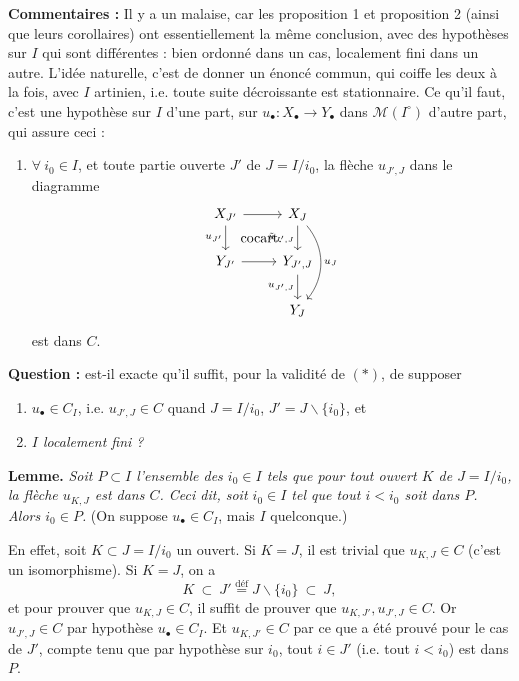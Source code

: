 \documentclass[11pt]{article}
\newcommand{\printedpage}[1]{\marginpar{\footnotesize p.~#1}}
\newcommand{\msp}[1]{\marginpar{\footnotesize [#1]}}
\newcommand{\cocart}{\textup{cocart.}}
\begin{document}
\textbf{Commentaires :} Il y a un malaise, car les proposition 1 et proposition 2 (ainsi que leurs corollaires) ont essentiellement la même conclusion, avec des hypothèses sur $I$ qui sont \msp{page 23} différentes : bien ordonné dans un cas, localement fini dans un autre. L'idée naturelle, c'est de donner un énoncé commun, qui coiffe les deux à la fois, avec $I$ artinien, i.e. toute suite décroissante est stationnaire. Ce qu'il faut, c'est une hypothèse sur $I$ d'une part, sur $u_\bullet : X_\bullet \longrightarrow Y_\bullet$ dans $\mathcal{M}(I^\circ)$ d'autre part, qui assure ceci :

\begin{enumerate}
\item[$(*)$] $\forall\ i_0 \in I$, et toute partie ouverte $J'$ de $J = I/i_0$, la flèche $u_{J',J}$ dans le diagramme
\[
\begin{tikzcd}
X_{J'} \arrow[r] \arrow[d, "u_{J'}"'] \arrow[dr, phantom, "\cocart"] & X_J \arrow[d, "\tilde{u}_{J',J}"'] \arrow[dd, bend left=40, "u_J"] \\
Y_{J'} \arrow[r] & Y_{J',J} \arrow[d, "u_{J',J}"'] \\
 & Y_J
\end{tikzcd}
\]
est dans $C$.
\end{enumerate}

\textbf{Question :} est-il exacte qu'il suffit, pour la validité de $(*)$, de supposer %
\begin{enumerate}
\item[a)] $u_\bullet \in C_I$, i.e. $u_{J',J} \in C$ quand $J = I/i_0$, $J' = J \backslash \{i_0\}$, et
\item[b)] \textit{$I$ localement fini ?}
\end{enumerate}

\printedpage{14}

\msp{page 24}

\textbf{Lemme.} \textit{Soit $P \subset I$ l'ensemble des $i_0 \in I$ tels que pour tout ouvert $K$ de $J = I/i_0$, la flèche $u_{K,J}$ est dans $C$. Ceci dit, soit $i_0 \in I$ tel que tout $i < i_0$ soit dans $P$. Alors $i_0 \in P$.} (On suppose $u_\bullet \in C_I$, mais $I$ quelconque.)

En effet, soit $K \subset J = I/i_0$ un ouvert. Si $K = J$, il est trivial que $u_{K,J} \in C$ (c'est un isomorphisme). Si $K = J$, on a %
\[
K \ \subset\ J' \overset{\text{déf}}{=} J\backslash\{i_0\} \ \subset\ J,
\]
et pour prouver que $u_{K,J} \in C$, il suffit de prouver que $u_{K,J'}, u_{J',J} \in C$. Or $u_{J',J} \in C$ par hypothèse $u_\bullet \in C_I$. Et $u_{K,J'} \in C$ par ce que a été prouvé pour le cas de $J'$, compte tenu que par hypothèse sur $i_0$, tout $i \in J'$ (i.e. tout $i < i_0$) est dans $P$. %
\end{document}
